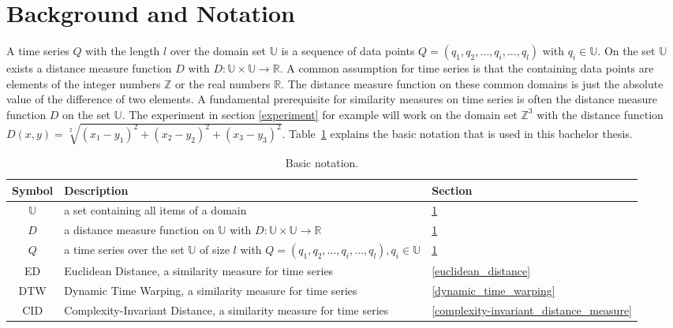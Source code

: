 \section{Background and Notation} \label{background_and_notation}
A time series $Q$ with the length $l$ over the domain set $\mathbb{U}$ is a sequence of data points
$Q = (q_1, q_2, \dots, q_i, \dots, q_l)$ with $q_i \in \mathbb{U}$. On the set $\mathbb{U}$ exists a distance measure
function $D$ with $D: \mathbb{U} \times \mathbb{U} \to \mathbb{R}$. A common assumption for time series is that the
containing data points are elements of the integer numbers $\mathbb{Z}$ or the real numbers $\mathbb{R}$. The distance
measure function on these common domains is just the absolute value of the difference of two elements. A fundamental
prerequisite for similarity measures on time series is often the distance measure function $D$ on the set
$\mathbb{U}$. The experiment in section \ref{experiment} for example will work on the domain set $\mathbb{Z}^3$ with the
distance function $D(x,y) = \sqrt[2]{(x_1-y_1)^2 + (x_2-y_2)^2 + (x_3-y_3)^2}$. Table~\ref{tab:notation} explains the
basic notation that is used in this bachelor thesis.

\begin{table}[H]
    \begin{center}
        \begin{tabularx}{\textwidth}{c X l}
            \textbf{Symbol} \qquad & \textbf{Description} & \qquad \textbf{Section}\\
            \hline
            $\mathbb{U}$ & a set containing all items of a domain & \qquad \ref{background_and_notation}\\
            $D$ & a distance measure function on $\mathbb{U}$ with $D: \mathbb{U} \times \mathbb{U} \to \mathbb{R}$
                & \qquad \ref{background_and_notation}\\
            $Q$ & a time series over the set $\mathbb{U}$ of size $l$ with
                $Q = (q_1, q_2, \dots, q_i, \dots, q_l), q_i \in \mathbb{U}$ & \qquad \ref{background_and_notation}\\
            ED & Euclidean Distance, a similarity measure for time series & \qquad \ref{euclidean_distance}\\
            DTW & Dynamic Time Warping, a similarity measure for time series & \qquad \ref{dynamic_time_warping}\\
            CID & Complexity-Invariant Distance, a similarity measure for time series
                & \qquad \ref{complexity-invariant_distance_measure}\\
        \end{tabularx}
    \end{center}
    \caption{Basic notation.}
	\label{tab:notation}
\end{table}




